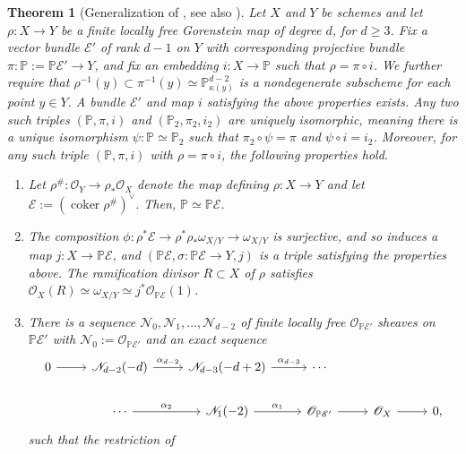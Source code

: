 \documentclass[12 pt]{amsart}
\newcommand{\rboxed}[1]{#1}
\theoremstyle{plain}
\newtheorem{theorem}[subsection]{Theorem}
\theoremstyle{definition}
\theoremstyle{remark}
\numberwithin{equation}{section}
\newcommand\bp{\mathbb P}
\newcommand\sce{\mathscr E}
\newcommand\scn{\mathscr N}
\newcommand\sco{\mathscr O}
\newcommand \ra{\rightarrow}
\DeclareMathOperator\coker{coker}
\begin{document}
\begin{theorem}[Generalization of , see also
]
	\label{theorem:ce-main-generalized}
Let $X$ and $Y$ be schemes and let $\rho: X
\ra Y$ be a finite locally free 
Gorenstein map of degree $d$, for $d
\geq 3$. Fix a vector bundle $\sce'$ of rank $d - 1$ on $Y$ with corresponding
projective bundle $\pi: \bp := \bp \sce' \to Y$, and fix 
an embedding $i: X \ra \bp$ such that $\rho = \pi \circ i$.
We further require that $\rho^{-1}(y) \subset \pi^{-1}(y) \simeq
\bp^{d-2}_{\kappa(y)}$ is a nondegenerate subscheme
for each point $y \in Y$.  
A bundle $\sce'$ and map $i$ satisfying the above properties exists.
Any two such triples $(\bp, \pi, i)$ and $(\bp_2,
	\pi_2,
i_2)$ are uniquely isomorphic, meaning there is a unique isomorphism $\psi: \bp
\simeq \bp_2$ such that $\pi_2 \circ \psi = \pi$ and $\psi \circ i = i_2$.
Moreover, for any such triple $(\bp, \pi, i)$ with $\rho = \pi \circ i$, the
following properties hold. 
\begin{enumerate} 
	\item[(i)] Let $\rboxed{\rho^\#} :
		\sco_Y \ra \rho_* \sco_X$ denote the  map defining
		$\rho: X \ra Y$ and let $\sce := (\coker \rho^\#)^\vee$.  
		Then, $\bp \simeq \bp \sce$.
	 \item[(ii)] The composition $\phi:
		\rho^* \sce \ra \rho^* \rho_* \omega_{X/Y} \ra \omega_{X/Y}$ is
		surjective, and so induces a map 
		$j: X \to \bp \mathscr E$, and $(\bp \sce, \sigma: \bp \sce \to
		Y, j)$ is a triple satisfying the properties above.
		The ramification divisor $R \subset X$ of $\rho$ satisfies
		$\sco_X(R) \simeq \omega_{X/Y} \simeq j^*
		\sco_{\bp \sce}(1)$.  
	\item[(iii)] There is a sequence
		$\scn_0, \scn_1, \ldots, \scn_{d-2}$ of finite locally free
		$\sco_{\bp \sce'}$ sheaves on $\bp \sce'$
		with $\scn_0 :=\sco_{\bp \sce'}$
		and an exact sequence
		\begin{equation} \label{equation:minimal-resolution}
			\begin{tikzcd} 0 \ar {r} &  \scn_{d-2}(-d) \ar
				{r}{\alpha_{d-2}} & \scn_{d-3}(-d+2) \ar
				{r}{\alpha_{d-3}} & \cdots \\
				& \cdots \ar {r}{\alpha_2} &
				\scn_1(-2) \ar{r}{\alpha_1} & \sco_{\bp \sce'} \ar{r} &
		\sco_X \ar{r}& 0, \end{tikzcd}\end{equation}
				such that
				the restriction of

\end{enumerate}
\end{theorem}
\end{document}

